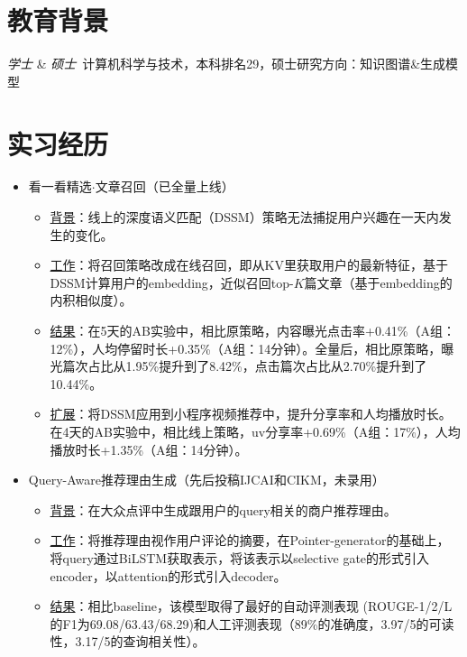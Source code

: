 \documentclass{resume}
\begin{document}


 
\section{教育背景}
\textit{学士} \& \textit{硕士}\ 计算机科学与技术，本科排名29，硕士研究方向：知识图谱\&生成模型

\section{实习经历}
\begin{itemize}
	\item 看一看精选$\cdot$文章召回（已全量上线）
	\begin{itemize}
		\item \underline{背景}：线上的深度语义匹配（DSSM）策略无法捕捉用户兴趣在一天内发生的变化。
		\item \underline{工作}：将召回策略改成在线召回，即从KV里获取用户的最新特征，基于DSSM计算用户的embedding，近似召回top-$K$篇文章（基于embedding的内积相似度）。
		\item \underline{结果}：在5天的AB实验中，相比原策略，内容曝光点击率+0.41\%（A组：12\%），人均停留时长+0.35\%（A组：14分钟）。全量后，相比原策略，曝光篇次占比从1.95\%提升到了8.42\%，点击篇次占比从2.70\%提升到了10.44\%。
		\item \underline{扩展}：将DSSM应用到小程序视频推荐中，提升分享率和人均播放时长。在4天的AB实验中，相比线上策略，uv分享率+0.69\%（A组：17\%），人均播放时长+1.35\%（A组：14分钟）。
	\end{itemize}
\end{itemize}

\begin{itemize}
	\item Query-Aware推荐理由生成（先后投稿IJCAI和CIKM，未录用）
	\begin{itemize}
		\item \underline{背景}：在大众点评中生成跟用户的query相关的商户推荐理由。
		\item \underline{工作}：将推荐理由视作用户评论的摘要，在Pointer-generator的基础上，将query通过BiLSTM获取表示，将该表示以selective gate的形式引入encoder，以attention的形式引入decoder。
		\item \underline{结果}：相比baseline，该模型取得了最好的自动评测表现 (ROUGE-1/2/L的F1为69.08/63.43/68.29)和人工评测表现（89\%的准确度，3.97/5的可读性，3.17/5的查询相关性）。
	\end{itemize}
\end{itemize}
\end{document}
